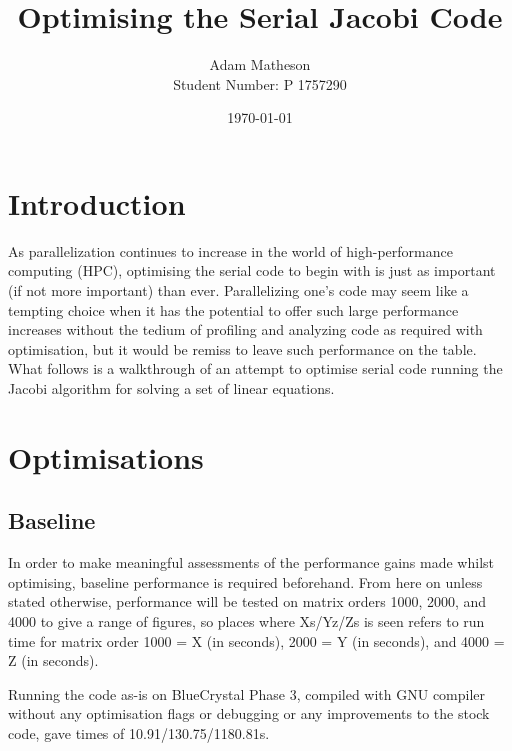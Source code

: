 \documentclass{article}
\begin{document}
\title{Optimising the Serial Jacobi Code}
\author{Adam Matheson \\
Student Number: P 1757290}
\date{\today}
\maketitle

\section{Introduction}
As parallelization continues to increase in the world of high-performance computing (HPC), optimising the serial code to begin with is just as important (if not more important) than ever. Parallelizing one's code may seem like a tempting choice when it has the potential to offer such large performance increases without the tedium of profiling and analyzing code as required with optimisation, but it would be remiss to leave such performance on the table. What follows is a walkthrough of an attempt to optimise serial code running the Jacobi algorithm for solving a set of linear equations.

\section{Optimisations}
\subsection{Baseline}
In order to make meaningful assessments of the performance gains made whilst optimising, baseline performance is required beforehand. From here on unless stated otherwise, performance will be tested on matrix orders 1000, 2000, and 4000 to give a range of figures, so places where Xs/Yz/Zs is seen refers to run time for matrix order 1000 = X (in seconds), 2000 = Y (in seconds), and 4000 = Z (in seconds).

Running the code as-is on BlueCrystal Phase 3, compiled with GNU compiler without any optimisation flags or debugging or any improvements to the stock code, gave times of 10.91/130.75/1180.81s.
\end{document}
